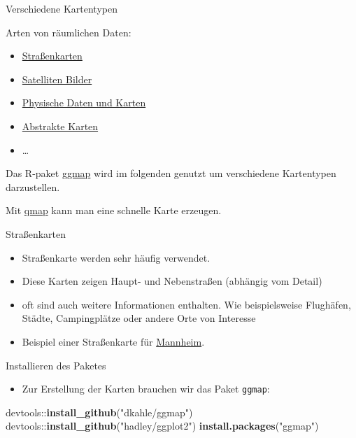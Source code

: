 \documentclass[ignorenonframetext,]{beamer}
\newenvironment{Shaded}{}{}
\newcommand{\KeywordTok}[1]{\textcolor[rgb]{0.00,0.44,0.13}{\textbf{{#1}}}}
\newcommand{\StringTok}[1]{\textcolor[rgb]{0.25,0.44,0.63}{{#1}}}
\newcommand{\NormalTok}[1]{{#1}}
\providecommand{\tightlist}{%
\setlength{\itemsep}{0pt}\setlength{\parskip}{0pt}}
\begin{document}
\begin{frame}{Verschiedene Kartentypen}

Arten von räumlichen Daten:

\begin{itemize}
\tightlist
\item
  \href{https://www.nceas.ucsb.edu/~frazier/RSpatialGuides/ggmap/ggmapCheatsheet.pdf}{Straßenkarten}
\item
  \href{http://www.mostlymuppet.com/tag/maps/}{Satelliten Bilder}
\item
  \href{http://gis.stackexchange.com/questions/3083/what-makes-a-map-beautiful/45518\#45518}{Physische
  Daten und Karten}
\item
  \href{http://www.designfaves.com/2014/03/abstracted-maps-reveal-cities-personalities}{Abstrakte
  Karten}
\item
  \ldots{}
\end{itemize}

Das R-paket
\href{http://journal.r-project.org/archive/2013-1/kahle-wickham.pdf}{ggmap}
wird im folgenden genutzt um verschiedene Kartentypen darzustellen.

Mit \href{http://www.inside-r.org/packages/cran/ggmap/docs/qmap}{qmap}
kann man eine schnelle Karte erzeugen.

\end{frame}

\begin{frame}{Straßenkarten}

\begin{itemize}
\tightlist
\item
  Straßenkarte werden sehr häufig verwendet.
\item
  Diese Karten zeigen Haupt- und Nebenstraßen (abhängig vom Detail)
\item
  oft sind auch weitere Informationen enthalten. Wie beispielsweise
  Flughäfen, Städte, Campingplätze oder andere Orte von Interesse
\item
  Beispiel einer Straßenkarte für
  \href{http://rpubs.com/Japhilko82/OpenStreetMap_Mannheim}{Mannheim}.
\end{itemize}

\end{frame}

\begin{frame}[fragile]{Installieren des Paketes}

\begin{itemize}
\tightlist
\item
  Zur Erstellung der Karten brauchen wir das Paket \texttt{ggmap}:
\end{itemize}

\begin{Shaded}
\begin{Highlighting}[]
\NormalTok{devtools::}\KeywordTok{install_github}\NormalTok{(}\StringTok{"dkahle/ggmap"}\NormalTok{)}
\NormalTok{devtools::}\KeywordTok{install_github}\NormalTok{(}\StringTok{"hadley/ggplot2"}\NormalTok{)}
\KeywordTok{install.packages}\NormalTok{(}\StringTok{"ggmap"}\NormalTok{)}
\end{Highlighting}
\end{Shaded}

\end{frame}
\end{document}

